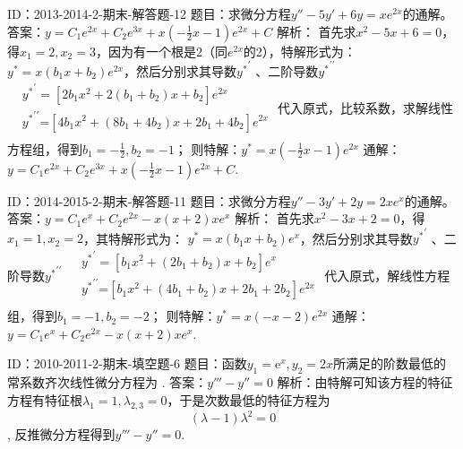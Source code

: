 ID：2013-2014-2-期末-解答题-12
题目：求微分方程${y}''-5{y}'+6y=x{{e}^{2x}}$的通解。
答案：$y={{C}_{1}}{{e}^{2x}}+{{C}_{2}}{{e}^{3x}}+x\left( -\frac{1}{2}x-1 \right){{e}^{2x}}+C$
解析：
首先求${{x}^{2}}-5x+6=0$，得${{x}_{1}}=2,{{x}_{2}}=3$，因为有一个根是2（同${{e}^{2x}}$的2），特解形式为：
${{y}^{\text{*}}}=x\left( {{b}_{1}}x+{{b}_{2}} \right){{e}^{2x}}$，然后分别求其导数${{y}^{*}}^{\prime }$ 、二阶导数${{y}^{*}}^{\prime \prime }$
$\begin{align}
  & {{y}^{*}}^{\prime }=\left[ 2{{b}_{1}}{{x}^{2}}+2\left( {{b}_{1}}+{{b}_{2}} \right)x+{{b}_{2}} \right]{{e}^{2x}} \\ 
 & {{y}^{*}}^{\prime \prime }\text{=}\left[ 4{{b}_{1}}{{x}^{2}}+\left( 8{{b}_{1}}+4{{b}_{2}} \right)x+2{{b}_{1}}+4{{b}_{2}} \right]{{e}^{2x}} \\ 
\end{align}$
代入原式，比较系数，求解线性方程组，得到${{b}_{1}}=-\frac{1}{2},{{b}_{2}}=-1$；
则特解：${{y}^{*}}=x\left( -\frac{1}{2}x-1 \right){{e}^{2x}}$
通解：$y={{C}_{1}}{{e}^{2x}}+{{C}_{2}}{{e}^{3x}}+x\left( -\frac{1}{2}x-1 \right){{e}^{2x}}+C$.

ID：2014-2015-2-期末-解答题-11
题目：求微分方程${y}''-3{y}'+2y=2x{{e}^{x}}$的通解。
答案：$y={{C}_{1}}{{e}^{x}}+{{C}_{2}}{{e}^{2x}}-x\left( x+2 \right)x{{e}^{x}}$
解析：
首先求${{x}^{2}}-3x+2=0$，得${{x}_{1}}=1,{{x}_{2}}=2$，其特解形式为：
${{y}^{\text{*}}}=x\left( {{b}_{1}}x+{{b}_{2}} \right){{e}^{x}}$，然后分别求其导数${{y}^{*}}^{\prime }$ 、二阶导数${{y}^{*}}^{\prime \prime }$
$\begin{align}
  & {{y}^{*}}^{\prime }=\left[ {{b}_{1}}{{x}^{2}}+\left( 2{{b}_{1}}+{{b}_{2}} \right)x+{{b}_{2}} \right]{{e}^{x}} \\ 
 & {{y}^{*}}^{\prime \prime }\text{=}\left[ {{b}_{1}}{{x}^{2}}+\left( 4{{b}_{1}}+{{b}_{2}} \right)x+2{{b}_{1}}+2{{b}_{2}} \right]{{e}^{2x}} \\ 
\end{align}$
代入原式，解线性方程组，得到${{b}_{1}}=-1,{{b}_{2}}=-2$；
则特解：${{y}^{*}}=x\left( -x-2 \right){{e}^{2x}}$
通解：$y={{C}_{1}}{{e}^{x}}+{{C}_{2}}{{e}^{2x}}-x\left( x+2 \right)x{{e}^{x}}$.

ID：2010-2011-2-期末-填空题-6
题目：函数${{y}_{1}}={{\text{e}}^{x}},{{y}_{2}}=2x$所满足的阶数最低的常系数齐次线性微分方程为			.
答案：${y}'''-{y}''=0$
解析：由特解可知该方程的特征方程有特征根${{\lambda }_{1}}=1,{{\lambda }_{2,3}}=0$，于是次数最低的特征方程为
	\[\left( \lambda -1 \right){{\lambda }^{2}}=0\],
反推微分方程得到${y}'''-{y}''=0$.

